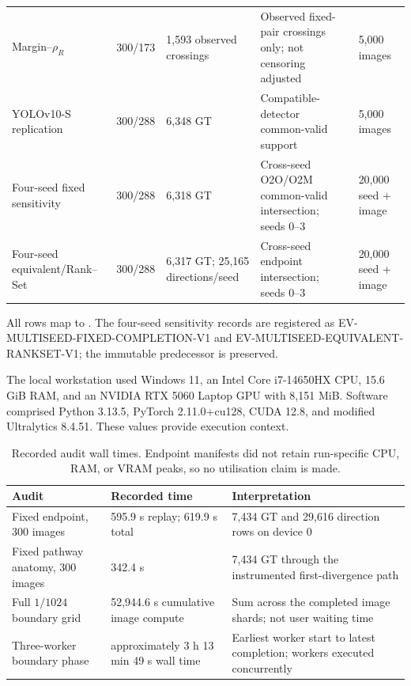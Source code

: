 \documentclass[preprint,10pt]{elsarticle}
\begin{document}
\begin{table}[p]
\begin{tabularx}{\textwidth}{@{}p{}p{}p{}Xp{}@{}}
Margin--$\rho_R$ & 300/173 & 1,593 observed crossings & Observed fixed-pair crossings only; not censoring adjusted & 5,000 images \\
YOLOv10-S replication & 300/288 & 6,348 GT & Compatible-detector common-valid support & 5,000 images \\
Four-seed fixed sensitivity & 300/288 & 6,318 GT & Cross-seed O2O/O2M common-valid intersection; seeds 0--3 & 20,000 seed + image \\
Four-seed equivalent/Rank--Set & 300/288 & 6,317 GT; 25,165 directions/seed & Cross-seed endpoint intersection; seeds 0--3 & 20,000 seed + image \\
\bottomrule
\end{tabularx}
\end{table}

All rows map to . The four-seed sensitivity records are registered as EV-MULTISEED-FIXED-COMPLETION-V1 and EV-MULTISEED-EQUIVALENT-RANKSET-V1; the immutable  predecessor is preserved.

The local workstation used Windows 11, an Intel Core i7-14650HX CPU, 15.6 GiB RAM, and an NVIDIA RTX 5060 Laptop GPU with 8,151 MiB. Software comprised Python 3.13.5, PyTorch 2.11.0+cu128, CUDA 12.8, and modified Ultralytics 8.4.51. These values provide execution context.

\begin{table}[ht]
\centering
\caption{Recorded audit wall times. Endpoint manifests did not retain run-specific CPU, RAM, or VRAM peaks, so no utilisation claim is made.}
\begin{tabularx}{\textwidth}{@{}p{}p{}X@{}}
\toprule
Audit & Recorded time & Interpretation \\
\midrule
Fixed endpoint, 300 images & 595.9 s replay; 619.9 s total & 7,434 GT and 29,616 direction rows on device 0 \\
Fixed pathway anatomy, 300 images & 342.4 s & 7,434 GT through the instrumented first-divergence path \\
Full $1/1024$ boundary grid & 52,944.6 s cumulative image compute & Sum across the completed image shards; not user waiting time \\
Three-worker boundary phase & approximately 3 h 13 min 49 s wall time & Earliest worker start to latest completion; workers executed concurrently \\
\bottomrule
\end{tabularx}
\end{table}
\end{document}
